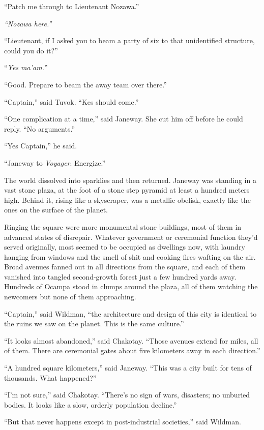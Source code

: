 \documentclass[twoside,letterpaper,12pt]{memoir}
\begin{document}
``Patch me through to Lieutenant Nozawa.'' 

\textit{``Nozawa here.''} 

``Lieutenant, if I asked you to beam a party of six to that unidentified structure, could you do it?'' 

``\textit{Yes ma'am.}'' 

``Good. Prepare to beam the away team over there.'' 

``Captain,'' said Tuvok. ``Kes should come.'' 

``One complication at a time,'' said Janeway. She cut him off before he could reply. ``No arguments.'' 

``Yes Captain,'' he said. 

``Janeway to \textit{Voyager}. Energize.'' 

The world dissolved into sparklies and then returned. Janeway was standing in a vast stone plaza, at the foot of a stone step pyramid at least a hundred meters high. Behind it, rising like a skyscraper, was a metallic obelisk, exactly like the ones on the surface of the planet. 

Ringing the square were more monumental stone buildings, most of them in advanced states of disrepair. Whatever government or ceremonial function they'd served originally, most seemed to be occupied as dwellings now, with laundry hanging from windows and the smell of shit and cooking fires wafting on the air. Broad avenues fanned out in all directions from the square, and each of them vanished into tangled second-growth forest just a few hundred yards away. Hundreds of Ocampa stood in clumps around the plaza, all of them watching the newcomers but none of them approaching. 

``Captain,'' said Wildman, ``the architecture and design of this city is identical to the ruins we saw on the planet. This is the same culture.'' 

``It looks almost abandoned,'' said Chakotay. ``Those avenues extend for miles, all of them. There are ceremonial gates about five kilometers away in each direction.'' 

``A hundred square kilometers,'' said Janeway. ``This was a city built for tens of thousands. What happened?'' 

``I'm not sure,'' said Chakotay. ``There's no sign of wars, disasters; no unburied bodies. It looks like a slow, orderly population decline.'' 

``But that never happens except in post-industrial societies,'' said Wildman. 
\end{document}
